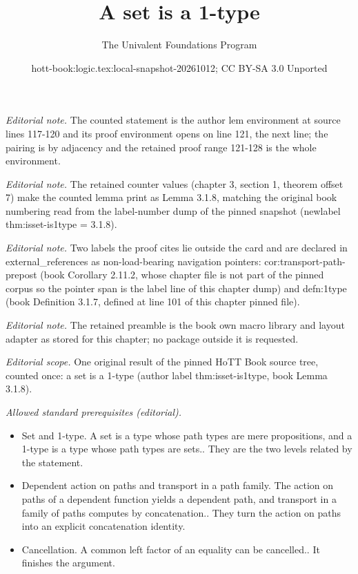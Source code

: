\documentclass[10pt,a4paper]{article}
\title{A set is a 1-type}
\author{The Univalent Foundations Program}
\date{hott-book:logic.tex:local-snapshot-20261012; CC BY-SA 3.0 Unported}
\newcounter{chapter}
\theoremstyle{definition}
\theoremstyle{remark}
\numberwithin{equation}{section}
\begin{document}
\maketitle
\setcounter{chapter}{3}
\setcounter{section}{1}
\setcounter{thm}{7}
\noindent\textit{Editorial note.} The counted statement is the author lem environment at source lines 117-120 and its proof environment opens on line 121, the next line; the pairing is by adjacency and the retained proof range 121-128 is the whole environment.\par\medskip
\noindent\textit{Editorial note.} The retained counter values (chapter 3, section 1, theorem offset 7) make the counted lemma print as Lemma 3.1.8, matching the original book numbering read from the label-number dump of the pinned snapshot (newlabel thm:isset-is1type = 3.1.8).\par\medskip
\noindent\textit{Editorial note.} Two labels the proof cites lie outside the card and are declared in external\_references as non-load-bearing navigation pointers: cor:transport-path-prepost (book Corollary 2.11.2, whose chapter file is not part of the pinned corpus so the pointer span is the label line of this chapter dump) and defn:1type (book Definition 3.1.7, defined at line 101 of this chapter pinned file).\par\medskip
\noindent\textit{Editorial note.} The retained preamble is the book own macro library and layout adapter as stored for this chapter; no package outside it is requested.\par\medskip
\noindent\textit{Editorial scope.} One original result of the pinned HoTT Book source tree, counted once: a set is a 1-type (author label thm:isset-is1type, book Lemma 3.1.8).\par\medskip
\noindent\textit{Allowed standard prerequisites (editorial).}\begin{itemize}
\item Set and 1-type. A set is a type whose path types are mere propositions, and a 1-type is a type whose path types are sets.. They are the two levels related by the statement.
\item Dependent action on paths and transport in a path family. The action on paths of a dependent function yields a dependent path, and transport in a family of paths computes by concatenation.. They turn the action on paths into an explicit concatenation identity.
\item Cancellation. A common left factor of an equality can be cancelled.. It finishes the argument.
\end{itemize}\medskip
\end{document}
